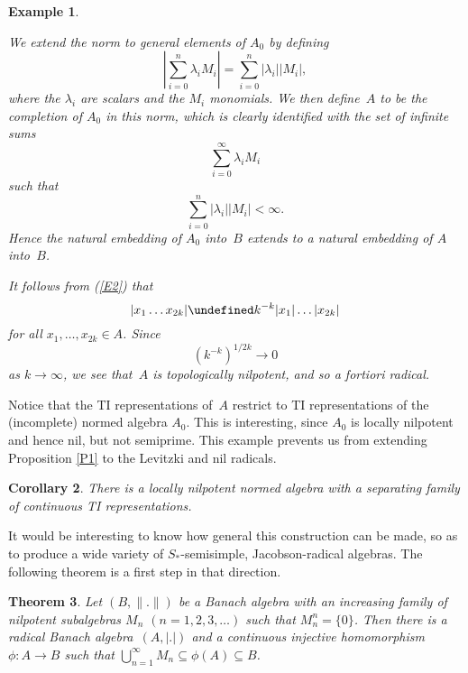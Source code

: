 \documentclass[11pt]{article}
\newcommand{\sseq}{\subseteq}
\let\leq\undefined  \let\geq\undefined
\let\le\leq   \let\ge\geq
\newtheorem{thm}{Theorem}[section]
\newtheorem{cor}[thm]{Corollary}
\newtheorem{example}[thm]{Example}
\newenvironment{Example}{\begin{example}\begin{rm}}{\end{rm}\end{example}}
\newcommand{\nn}[1]{|#1|}
\newcommand{\bignn}[1]{\left|#1\right|}
\begin{document}
\begin{Example}
We extend the norm to general elements of $A_0$ by defining
$$\bignn{\sum_{i=0}^n \lambda_iM_i} = \sum_{i=0}^n |\lambda_i|\nn{M_i},$$
where the $\lambda_i$ are scalars and the $M_i$ monomials.
We then define~$A$ to be the completion of $A_0$ in this norm, which is
clearly identified with the set of infinite sums
$$\sum_{i=0}^\infty \lambda_iM_i$$ such that
$$\sum_{i=0}^n |\lambda_i|\nn{M_i} < \infty.$$
Hence the natural embedding of $A_0$ into~$B$ extends to a natural
embedding of $A$ into~$B$.

It follows from (\ref{E2}) that
$$\nn{x_1\dots x_{2k}} \le k^{-k} \nn{x_1}\dots\nn{x_{2k}}$$
for all $x_1,\dots,x_{2k} \in A$.   Since
$$\left(k^{-k}\right)^{1/2k} \to 0$$
as $k\to\infty$, we see that~$A$ is topologically nilpotent, and
so {\em a fortiori} radical.
\end{Example}

Notice that the TI representations of~$A$ restrict to TI representations
of the (incomplete) normed algebra $A_0$.    This is interesting, since
$A_0$ is locally nilpotent and hence nil, but not semiprime.   This example
prevents us from extending Proposition \ref{P1} to the Levitzki and nil radicals.

\begin{cor}\label{C11}
There is a locally nilpotent normed algebra with a separating family of
continuous TI representations.
\end{cor}

It would be interesting to know how general this construction can be made,
so as to produce a wide variety of $S_*$-semisimple, Jacobson-radical algebras.
The following theorem is a first step in that direction.

\begin{thm}\label{T9}
Let $(B,\|.\|)$ be a Banach algebra with an increasing family of nilpotent subalgebras
$M_n$ $(n = 1,2,3,\dots)$ such that $M_n^n = \{0\}$.   Then there is a radical
Banach algebra~$(A,|.|)$ and a continuous injective homomorphism $\phi:A \to B$
such that $\bigcup_{n=1}^\infty M_n \sseq \phi(A) \sseq B$.
\end{thm}
\end{document}
